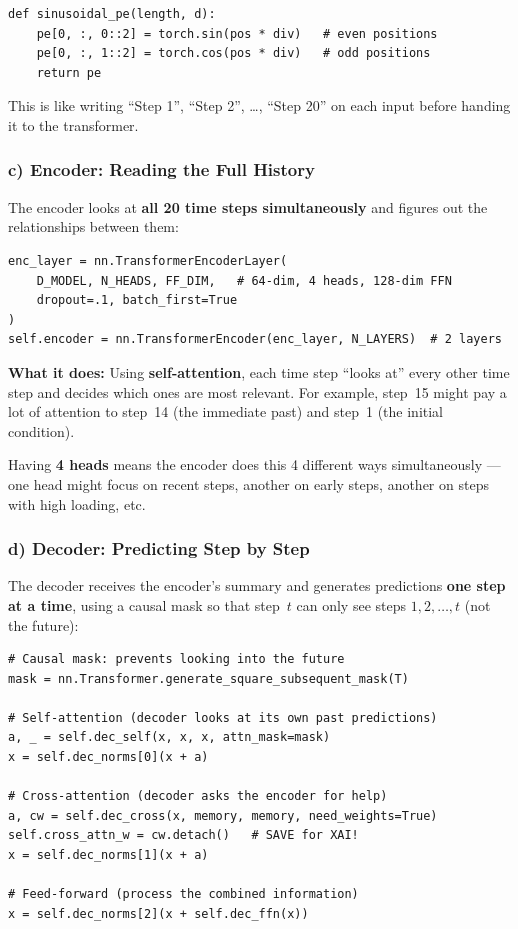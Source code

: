 \documentclass[11pt,a4paper]{article}
\begin{document}
\begin{lstlisting}
def sinusoidal_pe(length, d):
    pe[0, :, 0::2] = torch.sin(pos * div)   # even positions
    pe[0, :, 1::2] = torch.cos(pos * div)   # odd positions
    return pe
\end{lstlisting}

This is like writing ``Step 1'', ``Step 2'', \ldots, ``Step 20'' on
each input before handing it to the transformer.

\subsubsection{c) Encoder: Reading the Full History}

The encoder looks at \textbf{all 20 time steps simultaneously} and
figures out the relationships between them:

\begin{lstlisting}
enc_layer = nn.TransformerEncoderLayer(
    D_MODEL, N_HEADS, FF_DIM,   # 64-dim, 4 heads, 128-dim FFN
    dropout=.1, batch_first=True
)
self.encoder = nn.TransformerEncoder(enc_layer, N_LAYERS)  # 2 layers
\end{lstlisting}

\textbf{What it does:}  Using \textbf{self-attention}, each time step
``looks at'' every other time step and decides which ones are most
relevant.  For example, step~15 might pay a lot of attention to
step~14 (the immediate past) and step~1 (the initial condition).

Having \textbf{4 heads} means the encoder does this 4 different ways
simultaneously --- one head might focus on recent steps, another on
early steps, another on steps with high loading, etc.

\subsubsection{d) Decoder: Predicting Step by Step}

The decoder receives the encoder's summary and generates predictions
\textbf{one step at a time}, using a causal mask so that step~$t$
can only see steps $1, 2, \ldots, t$ (not the future):

\begin{lstlisting}
# Causal mask: prevents looking into the future
mask = nn.Transformer.generate_square_subsequent_mask(T)

# Self-attention (decoder looks at its own past predictions)
a, _ = self.dec_self(x, x, x, attn_mask=mask)
x = self.dec_norms[0](x + a)

# Cross-attention (decoder asks the encoder for help)
a, cw = self.dec_cross(x, memory, memory, need_weights=True)
self.cross_attn_w = cw.detach()   # SAVE for XAI!
x = self.dec_norms[1](x + a)

# Feed-forward (process the combined information)
x = self.dec_norms[2](x + self.dec_ffn(x))
\end{lstlisting}
\end{document}
